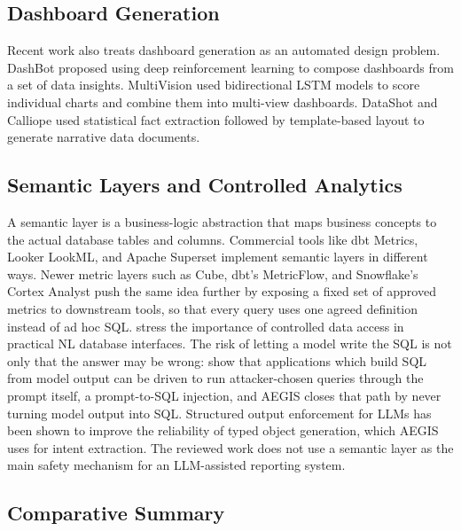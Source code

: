 \documentclass[pdflatex,sn-mathphys-num]{sn-jnl}
\begin{document}
\subsection{Dashboard Generation}

Recent work also treats dashboard generation as an automated design problem. DashBot \citep{deng2023dashbot} proposed using deep reinforcement learning to compose dashboards from a set of data insights. MultiVision \citep{wu2022multivision} used bidirectional LSTM models to score individual charts and combine them into multi-view dashboards. DataShot \citep{wang2020datashot} and Calliope \citep{shi2021calliope} used statistical fact extraction followed by template-based layout to generate narrative data documents.


\subsection{Semantic Layers and Controlled Analytics}

A semantic layer is a business-logic abstraction that maps business concepts to the actual database tables and columns. Commercial tools like dbt Metrics, Looker LookML, and Apache Superset implement semantic layers in different ways. Newer metric layers such as Cube, dbt's MetricFlow, and Snowflake's Cortex Analyst push the same idea further by exposing a fixed set of approved metrics to downstream tools, so that every query uses one agreed definition instead of ad hoc SQL. \citet{lehmann2022veezoo} stress the importance of controlled data access in practical NL database interfaces. The risk of letting a model write the SQL is not only that the answer may be wrong: \citet{pedro2025p2sql} show that applications which build SQL from model output can be driven to run attacker-chosen queries through the prompt itself, a prompt-to-SQL injection, and AEGIS closes that path by never turning model output into SQL. Structured output enforcement for LLMs \citep{openai2024structured} has been shown to improve the reliability of typed object generation, which AEGIS uses for intent extraction. The reviewed work does not use a semantic layer as the main safety mechanism for an LLM-assisted reporting system.


\subsection{Comparative Summary}
\end{document}

